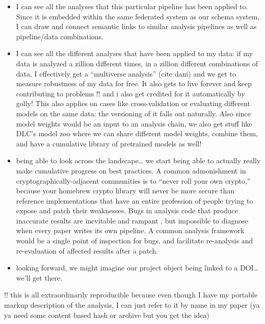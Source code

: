 \documentclass[10pt]{article}
\begin{document}
\begin{multicols}{2}
\begin{itemize}
\begin{itemize}
  \item
    I can see all the analyses that this particular pipeline has been
    applied to. Since it is embedded within the same federated system as
    our schema system, I can draw and connect semantic links to similar
    analysis pipelines as well as pipeline/data combinations.
  \item
    I can see all the different analyses that have been applied to my
    data: if my data is analyzed a zillion different times, in a zillion
    different combinations of data, I effectively get a ``multiverse
    analysis'' (cite dani) and we get to measure robustness of my data
    for free. It also gets to live forever and keep contributing to
    problems !! and i also get credited for it automatically by golly!
    This also applies on cases like cross-validation or evaluating
    different models on the same data: the versioning of it falls out
    naturally. Also since model weights would be an input to an analysis
    chain, we also get stuff like DLC's model zoo where we can share
    different model weights, combine them, and have a cumulative library
    of pretrained models as well!
  \item
    being able to look across the landscape\ldots{} we start being able
    to actually really make cumulative progress on best practices. A
    common admonishment in cryptographically-adjacent communities is to
    ``never roll your own crypto,'' because your homebrew crypto library
    will never be more secure than reference implementations that have
    an entire profession of people trying to expose and patch their
    weaknesses. Bugs in analysis code that produce inaccurate results
    are inevitable and rampant \cite{millerScientistNightmareSoftware2006, soergelRampantSoftwareErrors2015, eklundClusterFailureWhy2016a, bhandarineupaneCharacterizationLeptazolinesPolar2019} , but
    impossible to diagnose when every paper writes its own pipeline. A
    common analysis framework would be a single point of inspection for
    bugs, and facilitate re-analysis and re-evaluation of affected
    results after a patch.
  \item
    looking forward, we might imagine our project object being linked to
    a DOI\ldots{} we'll get there.
  \end{itemize}
\end{itemize}

!! this is all extraordinarily reproducible because even though I have
my portable markup description of the analysis, I can just refer to it
by name in my paper (ya ya need some content based hash or archive but
you get the idea)


\end{multicols}
\end{document}

